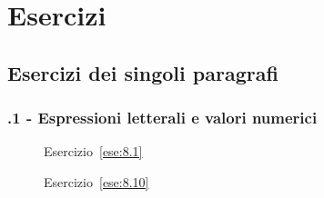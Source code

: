 \section{Esercizi}
\subsection{Esercizi dei singoli paragrafi}
\subsubsection*{\thechapter.1 - Espressioni letterali e valori numerici}
\begin{figure}[b]
\begin{minipage}[t]{.45\textwidth}
 \centering
 \caption{Esercizio~\ref{ese:8.1}}\label{fig:8.1}
\end{minipage}
 \begin{minipage}[t]{.45\textwidth}
 \centering 
 \caption{Esercizio~\ref{ese:8.10}}\label{fig:8.2}
\end{minipage}
\end{figure}

